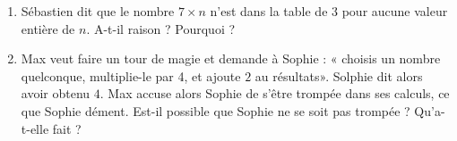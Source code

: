 
\begin{exercice}\label{exo2smath-0099}

    \begin{enumerate}
        \item
            
    Sébastien dit que le nombre \( 7\times n\) n'est dans la table de \( 3\) pour aucune valeur entière de \( n\). A-t-il raison ? Pourquoi ?

\item

    Max veut faire un tour de magie et demande à Sophie : « choisis un nombre quelconque, multiplie-le par 4, et ajoute \( 2\) au résultats». Solphie dit alors avoir obtenu \( 4\). Max accuse alors Sophie de s'être trompée dans ses calculs, ce que Sophie dément. Est-il possible que Sophie ne se soit pas trompée ? Qu'a-t-elle fait ?
    
    \end{enumerate}

\end{exercice}
